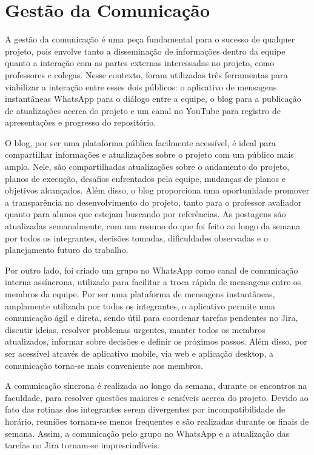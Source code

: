     \section{Gestão da Comunicação}
    A gestão da comunicação é uma peça fundamental para o sucesso de qualquer projeto, pois envolve tanto a disseminação de informações dentro da equipe quanto a interação com as partes externas interessadas no projeto, como professores e colegas. Nesse contexto, foram utilizadas três ferramentas para viabilizar a interação entre esses dois públicos: o aplicativo de mensagens instantâneas WhatsApp para o diálogo entre a equipe, o blog para a publicação de atualizações acerca do projeto e um canal no YouTube para registro de apresentações e progresso do repositório.

    O blog, por ser uma plataforma pública facilmente acessível, é ideal para compartilhar informações e atualizações sobre o projeto com um público mais amplo. Nele, são compartilhadas atualizações sobre o andamento do projeto, planos de execução, desafios enfrentados pela equipe, mudanças de planos e objetivos alcançados. Além disso, o blog proporciona uma oportunidade promover a transparência no desenvolvimento do projeto, tanto para o professor avaliador quanto para alunos que estejam buscando por referências. As postagens são atualizadas semanalmente, com um resumo do que foi feito ao longo da semana por todos os integrantes, decisões tomadas, dificuldades observadas e o planejamento futuro do trabalho.
    
    Por outro lado, foi criado um grupo no WhatsApp como canal de comunicação interna assíncrona, utilizado para facilitar a troca rápida de mensagens entre os membros da equipe. Por ser uma plataforma de mensagens instantâneas, amplamente utilizada por todos os integrantes, o aplicativo permite uma comunicação ágil e direta, sendo útil para coordenar tarefas pendentes no Jira, discutir ideias, resolver problemas urgentes, manter todos os membros atualizados, informar sobre decisões e definir os próximos passos. Além disso, por ser acessível através de aplicativo mobile, via web e aplicação desktop,  a comunicação torna-se mais conveniente aos membros.
    
    A comunicação síncrona é realizada ao longo da semana, durante os encontros na faculdade, para resolver questões maiores e sensíveis acerca do projeto. Devido ao fato das rotinas dos integrantes serem divergentes por incompatibilidade de horário, reuniões tornam-se menos frequentes e são realizadas durante os finais de semana. Assim, a comunicação pelo grupo no WhatsApp e a atualização das tarefas no Jira tornam-se imprescindíveis.



